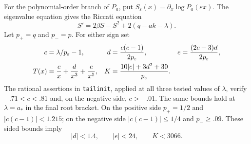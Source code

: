 \documentclass[11pt,a4paper]{article}
\numberwithin{equation}{section}
\theoremstyle{definition}
\theoremstyle{remark}
\begin{document}
For the polynomial-order branch of $P_a$, put
$S_\varepsilon(x)=\partial_x\log P_a(\varepsilon x)$.
The eigenvalue equation gives the Riccati equation
\begin{equation}\label{cert:Riccati}
 S'=2\beta S-S^2+2(q-ak-\lambda).
\end{equation}
Let $p_+=q$ and $p_-=p$.  For either sign set
\begin{align}
 c&=\lambda/p_\varepsilon-1,&
 d&=\frac{c(c-1)}{2p_\varepsilon},&
 e&=\frac{(2c-3)d}{2p_\varepsilon},\notag\\
 T(x)&=\frac c x+\frac d{x^3}+\frac e{x^5},&
 K&=\frac{10|e|+3d^2+30}{p_\varepsilon}.
 \label{cert:tail-coefficients}
\end{align}
The rational assertions in \texttt{tailinit}, applied at all three tested
values of $\lambda$, verify $-.71<c<.81$ and, on the negative side,
$c>-.01$.  The same bounds hold at $\lambda=a_*$ in the final root bracket.
On the positive side $p_+=1/2$ and $|c(c-1)|<1.215$; on the
negative side $|c(c-1)|\le1/4$ and $p_-\ge .09$.  These sided
bounds imply
\begin{equation}\label{cert:tail-constants}
 |d|<1.4,\qquad |e|<24,\qquad K<3066.
\end{equation}
\end{document}
